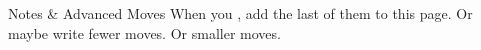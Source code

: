 \documentclass[darkmode]{dw2_playbook}
\begin{document}
%
\pageThree
    {
        Notes \& Advanced Moves
    }
    {
        \advancedMovesCont
    }
    {
      {
        When you , add the last of them to this page.  Or maybe write fewer moves.  Or smaller moves.
      }
    }
    {
      ~ %
    }



\clearpage
~

\resourceLinksPage
    {
    }
\end{document}
